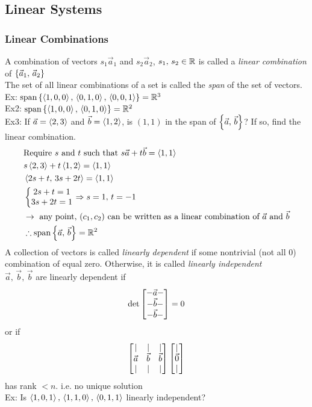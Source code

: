 \documentclass[11pt, fleqn]{article}
\begin{document}
\subsection{Linear Systems}
\subsubsection{Linear Combinations}
A combination of vectors $s_1\vec{a}_1$ and $s_2\vec{a}_2$, $s_1,\,s_2\in\mathbb{R}$ is called a \textit{linear combination} of $\left\{ \vec{a}_1,\,\vec{a}_2 \right\}$\\
The set of all linear combinations of a set is called the \textit{span} of the set of vectors.\\
Ex: $\operatorname{span}\left\{ \left\langle 1,0,0 \right\rangle,\,\left\langle 0,1,0 \right\rangle,\,\left\langle 0,0,1 \right\rangle \right\}=\mathbb{R}^3$\\
Ex2: $\operatorname{span}\left\{ \left\langle 1,0,0 \right\rangle,\,\left\langle 0,1,0 \right\rangle \right\}=\mathbb{R}^2$\\
Ex3: If $\vec{a}=\left\langle 2,3 \right\rangle$ and $\vec{b}=\left\langle 1,2 \right\rangle$, is $(1,1)$ in the span of $\left\{ \vec{a},\,\vec{b} \right\}$? If so, find the linear combination.
\begin{align*}
    &\text{Require $s$ and $t$ such that }s\vec{a}+t\vec{b}=\left\langle 1,1 \right\rangle\\
    &s\left\langle 2,3 \right\rangle+t\left\langle 1,2 \right\rangle=\left\langle 1,1 \right\rangle\\
    &\left\langle 2s+t,\,3s+2t \right\rangle=\left\langle 1,1 \right\rangle\\
    &\left\{\begin{matrix} 2s+t=1\\3s+2t=1 \end{matrix}\right.\Rightarrow s=1,\,t=-1\\
    &\to\text{ any point, }(c_1,c_2)\text{ can be written as a linear combination of }\vec{a}\text{ and }\vec{b}\\
    &\therefore\operatorname{span}\left\{ \vec{a},\,\vec{b} \right\}=\mathbb{R}^2
\end{align*}
A collection of vectors is called \textit{linearly dependent} if some nontrivial (not all 0) combination of equal zero. Otherwise, it is called \textit{linearly independent}\\
$\vec{a},\,\vec{b},\,\vec{b}$ are linearly dependent if
$$\det\matrixx{-\vec{a}-\\-\vec{b}-\\-\vec{b}-}=0$$
or if
$$\matrixx{|&|&|\\\vec{a}&\vec{b}&\vec{b}\\|&|&|}\matrixx{|\\\vec{0}\\|}$$
has rank $<n$. i.e. no unique solution\\
Ex: Is $\left\langle 1,0,1 \right\rangle,\,\left\langle 1,1,0 \right\rangle,\,\left\langle 0,1,1 \right\rangle$ linearly independent?
\end{document}
